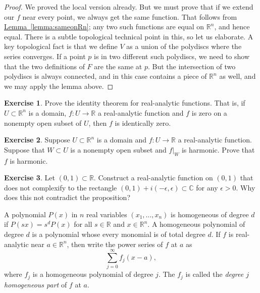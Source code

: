 \documentclass[12pt,openany]{book}
\newcommand{\C}{{\mathbb{C}}}
\newcommand{\R}{{\mathbb{R}}}
\newcommand{\myindex}[1]{#1\index{#1}}
\theoremstyle{plain}
\theoremstyle{remark}
\theoremstyle{definition}
\newenvironment{exbox}{%
    \def\FrameCommand{\vrule width 1pt \relax\hspace{10pt}}%
    \MakeFramed{\advance\hsize-\width\FrameRestore}%
}{%
    \endMakeFramed
}
\theoremstyle{exercise}
\newtheorem{exercise}{Exercise}[section]
\theoremstyle{example}
\newcommand{\lemmaref}[1]{\hyperref[#1]{Lemma~\ref*{#1}}}
\begin{document}
\begin{proof}
We proved the local version already.  But we must prove that if we
extend our $f$ near every point, we always get the same function.
That follows from \lemmaref{lemma:sameonRn}; any two such functions are
equal on $\R^n$, and hence equal.  There is a subtle topological technical
point in this, so let us elaborate.  A key topological fact is that we define
$V$ as a union of the polydiscs where the series converges.  If
a point $p$ is in two different such polydiscs, we need to show that
the two definitions of $F$ are the same at $p$.  But the intersection
of two polydiscs is always connected, and in this case contains a piece
of $\R^n$ as well, and we may apply the lemma above.
\end{proof}

\begin{exbox}
\begin{exercise}
Prove the identity theorem for real-analytic functions.  That is, if $U
\subset \R^n$ is a domain, $f \colon U \to \R$ a real-analytic function and
$f$ is zero on a nonempty open subset of $U$, then $f$ is identically zero.
\end{exercise}

\begin{exercise}
Suppose $U \subset \R^n$ is a domain and $f \colon U \to \R$ a real-analytic
function.  Suppose that $W \subset U$ is a nonempty open subset and
$f|_W$ is harmonic.  Prove that $f$ is harmonic.
\end{exercise}

\begin{exercise}
Let $(0,1) \subset \R$.  Construct a real-analytic function
on $(0,1)$ that does not complexify to the rectangle $(0,1) + i(-\epsilon,\epsilon)
\subset \C$ for any $\epsilon > 0$.  Why does this not contradict the
proposition?
\end{exercise}
\end{exbox}

A polynomial $P(x)$ in $n$ real variables $(x_1,\ldots,x_n)$ is homogeneous of degree $d$ if
$P(s x) = s^d P(x)$ for all $s \in \R$ and $x \in \R^n$.
A homogeneous polynomial of degree $d$ is a polynomial whose
every monomial
is of total degree $d$.
If $f$ is real-analytic near $a \in \R^n$, then
write the power series of $f$ at $a$ as
\begin{equation*}
\sum_{j=0}^{\infty} f_j(x-a) ,
\end{equation*}
where $f_j$ is a homogeneous polynomial of degree $j$.  The $f_j$ is 
called the
\emph{\myindex{degree $j$ homogeneous part}} of $f$
at $a$.
\end{document}
